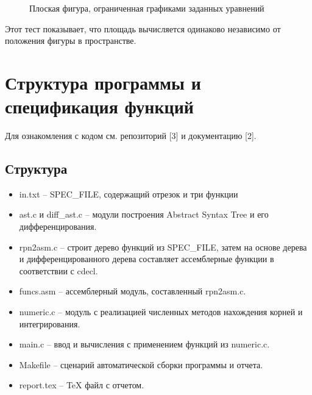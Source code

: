 \documentclass[a4paper,12pt,titlepage,finall]{article}
\begin{document}
\begin{figure}[h]
\caption{Плоская фигура, ограниченная графиками заданных уравнений}
\label{plot2}
\end{figure}

Этот тест показывает, что площадь вычисляется одинаково независимо от положения фигуры в пространстве. 


\newpage

\section{Структура программы и спецификация функций}

Для ознакомления с кодом см. репозиторий [3] и документацию [2].

\subsection{Структура}

\begin{itemize}
    \item in.txt -- SPEC\_FILE, содержащий отрезок и три функции
    \item ast.c и diff\_ast.c -- модули построения Abstract Syntax Tree и его дифференцирования.
    \item rpn2asm.c -- строит дерево функций из SPEC\_FILE, затем на основе дерева и дифференцированного дерева составляет ассемблерные функции в соответствии с cdecl.
    \item funcs.asm -- ассемблерный модуль, составленный rpn2asm.c.
    \item numeric.c -- модуль с реализацией численных методов нахождения корней и интегрирования.
    \item main.c -- ввод и вычисления с применением функций из numeric.c.
    \item Makefile -- сценарий автоматической сборки программы и отчета.
    \item report.tex -- TeX файл с отчетом.
\end{itemize}
\end{document}
